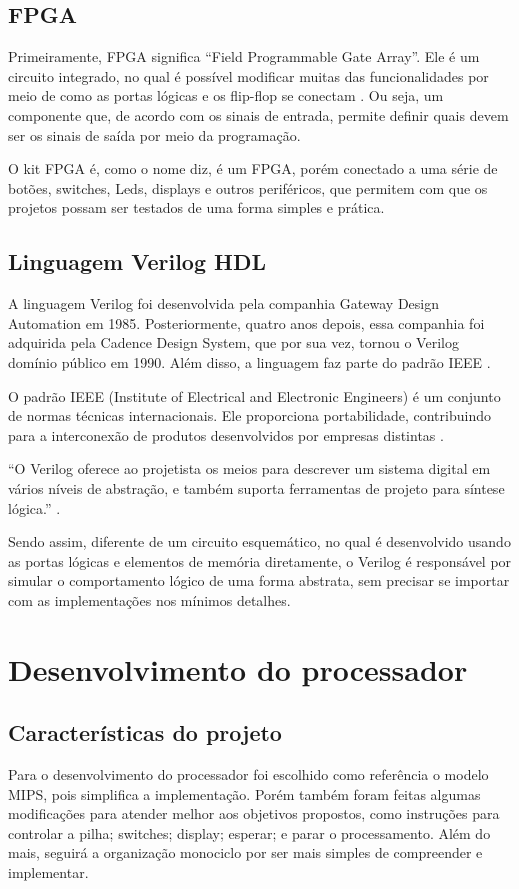 \documentclass[
	12pt,				%
	oneside,
	a4paper,			%
	english,			%
	french,				%
	spanish,			%
	brazil,				%
	]{abntex2}
\begin{document}
\section{FPGA}
Primeiramente, FPGA significa ``Field Programmable Gate Array''. Ele é um circuito integrado, no qual é possível modificar muitas das funcionalidades  por meio de como as portas lógicas e os flip-flop se conectam \cite{intel_fpga}. Ou seja, um componente que, de acordo com os sinais de entrada, permite definir quais devem ser os sinais de saída por meio da programação.

O kit FPGA é, como o nome diz, é um FPGA, porém conectado a uma série de botões, switches, Leds, displays e outros periféricos, que permitem com que os projetos possam ser testados de uma forma simples e prática.

\section{Linguagem Verilog HDL}
A linguagem Verilog foi desenvolvida pela companhia Gateway Design Automation em 1985. Posteriormente, quatro anos depois, essa companhia foi adquirida pela Cadence Design System, que por sua vez, tornou o Verilog domínio público em 1990. Além disso, a linguagem faz parte do padrão IEEE \cite{midorikawa2007}.

O padrão IEEE (Institute of Electrical and Electronic Engineers) é um conjunto de normas técnicas internacionais. Ele proporciona portabilidade, contribuindo para a interconexão de produtos desenvolvidos por empresas distintas \cite{midorikawa2007}.

“O Verilog oferece ao projetista os meios para descrever um sistema digital em vários níveis de abstração, e também suporta ferramentas de projeto para síntese lógica.” \cite{midorikawa2007}. 

Sendo assim, diferente de um circuito esquemático, no qual é desenvolvido usando as portas lógicas e elementos de memória diretamente, o Verilog é responsável por simular o comportamento lógico de uma forma abstrata, sem precisar se importar com as implementações nos mínimos detalhes.


\chapter{Desenvolvimento do processador}

\section{Características do projeto}
Para o desenvolvimento do processador foi escolhido como referência o modelo MIPS, pois simplifica a implementação. Porém também foram feitas algumas modificações para atender melhor aos objetivos propostos, como instruções para controlar a pilha; switches; display; esperar; e parar o processamento. Além do mais, seguirá a organização monociclo por ser mais simples de compreender e implementar.
\end{document}
